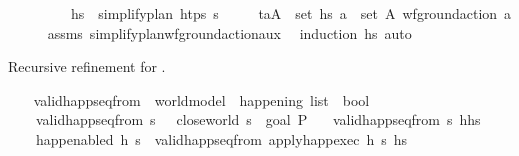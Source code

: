 \begin{isabellebody}
\ \ \ \ \ \ \ \ \ {\isachardoublequoteopen}hs\ {\isacharequal}{\kern0pt}\ simplify{\isacharunderscore}{\kern0pt}plan\ htps\ {\isasympi}s{\isachardoublequoteclose}\isanewline
\ \ \ \ \ {\isachardoublequoteopen}{\isasymforall}{\isacharparenleft}{\kern0pt}t\isactrlsub a{\isacharcomma}{\kern0pt}A{\isacharparenright}{\kern0pt}\ {\isasymin}\ set\ hs{\isachardot}{\kern0pt}\ {\isasymforall}a\ {\isasymin}\ set\ A{\isachardot}{\kern0pt}\ wf{\isacharunderscore}{\kern0pt}ground{\isacharunderscore}{\kern0pt}action\ a{\isachardoublequoteclose}\isanewline
%
\isadelimproof
\ \ \ \ %
\endisadelimproof
%
\isatagproof
{}\isamarkupfalse%
\ assms\ simplify{\isacharunderscore}{\kern0pt}plan{\isacharunderscore}{\kern0pt}wf{\isacharunderscore}{\kern0pt}ground{\isacharunderscore}{\kern0pt}action{\isacharunderscore}{\kern0pt}aux\ \isamarkupfalse%
\ {\isacharparenleft}{\kern0pt}induction\ hs{\isacharparenright}{\kern0pt}\ auto%
\endisatagproof
{\isafoldproof}%
%
\isadelimproof
%
\endisadelimproof
%
\begin{isamarkuptext}%
Recursive refinement for .%
\end{isamarkuptext}\isamarkuptrue%
\ \ \isamarkupfalse%
\ valid{\isacharunderscore}{\kern0pt}happ{\isacharunderscore}{\kern0pt}seq{\isacharunderscore}{\kern0pt}from\ {\isacharcolon}{\kern0pt}{\isacharcolon}{\kern0pt}\ {\isachardoublequoteopen}world{\isacharunderscore}{\kern0pt}model\ {\isasymRightarrow}\ happening\ list\ {\isasymRightarrow}\ bool{\isachardoublequoteclose}\ \isanewline
\ \ \ \ {\isachardoublequoteopen}valid{\isacharunderscore}{\kern0pt}happ{\isacharunderscore}{\kern0pt}seq{\isacharunderscore}{\kern0pt}from\ s\ {\isacharbrackleft}{\kern0pt}{\isacharbrackright}{\kern0pt}\ {\isasymlongleftrightarrow}\ close{\isacharunderscore}{\kern0pt}world\ s\ {\isasymTTurnstile}\ {\isacharparenleft}{\kern0pt}goal\ P{\isacharparenright}{\kern0pt}{\isachardoublequoteclose}\isanewline
\ \ {\isacharbar}{\kern0pt}\ {\isachardoublequoteopen}valid{\isacharunderscore}{\kern0pt}happ{\isacharunderscore}{\kern0pt}seq{\isacharunderscore}{\kern0pt}from\ s\ {\isacharparenleft}{\kern0pt}h{\isacharhash}{\kern0pt}hs{\isacharparenright}{\kern0pt}\ {\isasymlongleftrightarrow}\ \isanewline
\ \ \ \ {\isacharparenleft}{\kern0pt}happ{\isacharunderscore}{\kern0pt}enabled\ h\ s\ {\isasymand}\ valid{\isacharunderscore}{\kern0pt}happ{\isacharunderscore}{\kern0pt}seq{\isacharunderscore}{\kern0pt}from\ {\isacharparenleft}{\kern0pt}apply{\isacharunderscore}{\kern0pt}happ{\isacharunderscore}{\kern0pt}exec\ h\ s{\isacharparenright}{\kern0pt}\ hs{\isacharparenright}{\kern0pt}{\isachardoublequoteclose}%

\end{isabellebody}
